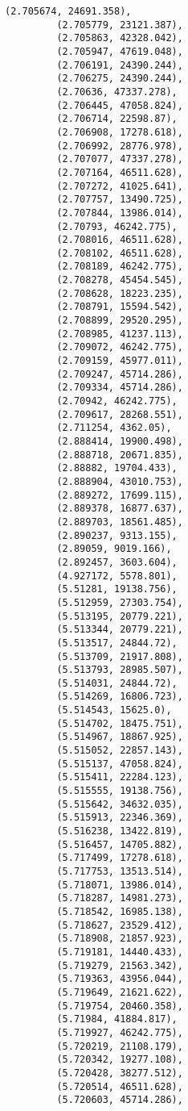 \documentclass[11pt]{article}
\begin{document}
\begin{Verbatim}[commandchars=\\\{\}]
         (2.705674, 24691.358),
         (2.705779, 23121.387),
         (2.705863, 42328.042),
         (2.705947, 47619.048),
         (2.706191, 24390.244),
         (2.706275, 24390.244),
         (2.70636, 47337.278),
         (2.706445, 47058.824),
         (2.706714, 22598.87),
         (2.706908, 17278.618),
         (2.706992, 28776.978),
         (2.707077, 47337.278),
         (2.707164, 46511.628),
         (2.707272, 41025.641),
         (2.707757, 13490.725),
         (2.707844, 13986.014),
         (2.70793, 46242.775),
         (2.708016, 46511.628),
         (2.708102, 46511.628),
         (2.708189, 46242.775),
         (2.708278, 45454.545),
         (2.708628, 18223.235),
         (2.708791, 15594.542),
         (2.708899, 29520.295),
         (2.708985, 41237.113),
         (2.709072, 46242.775),
         (2.709159, 45977.011),
         (2.709247, 45714.286),
         (2.709334, 45714.286),
         (2.70942, 46242.775),
         (2.709617, 28268.551),
         (2.711254, 4362.05),
         (2.888414, 19900.498),
         (2.888718, 20671.835),
         (2.88882, 19704.433),
         (2.888904, 43010.753),
         (2.889272, 17699.115),
         (2.889378, 16877.637),
         (2.889703, 18561.485),
         (2.890237, 9313.155),
         (2.89059, 9019.166),
         (2.892457, 3603.604),
         (4.927172, 5578.801),
         (5.51281, 19138.756),
         (5.512959, 27303.754),
         (5.513195, 20779.221),
         (5.513344, 20779.221),
         (5.513517, 24844.72),
         (5.513709, 21917.808),
         (5.513793, 28985.507),
         (5.514031, 24844.72),
         (5.514269, 16806.723),
         (5.514543, 15625.0),
         (5.514702, 18475.751),
         (5.514967, 18867.925),
         (5.515052, 22857.143),
         (5.515137, 47058.824),
         (5.515411, 22284.123),
         (5.515555, 19138.756),
         (5.515642, 34632.035),
         (5.515913, 22346.369),
         (5.516238, 13422.819),
         (5.516457, 14705.882),
         (5.717499, 17278.618),
         (5.717753, 13513.514),
         (5.718071, 13986.014),
         (5.718287, 14981.273),
         (5.718542, 16985.138),
         (5.718627, 23529.412),
         (5.718908, 21857.923),
         (5.719181, 14440.433),
         (5.719279, 21563.342),
         (5.719363, 43956.044),
         (5.719649, 21621.622),
         (5.719754, 20460.358),
         (5.71984, 41884.817),
         (5.719927, 46242.775),
         (5.720219, 21108.179),
         (5.720342, 19277.108),
         (5.720428, 38277.512),
         (5.720514, 46511.628),
         (5.720603, 45714.286),

\end{Verbatim}
\end{document}
